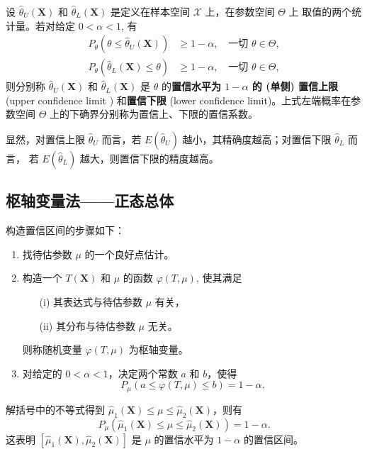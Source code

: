 \begin{definition}[单侧置信上限与置信下限]\label{def:one_sided_confidence_limit}
设 $\hat{\theta}_U(\mathbf{X})$ 和 $\hat{\theta}_L(\mathbf{X})$ 是定义在样本空间 $\mathcal{X}$ 上，在参数空间 $\Theta$ 上
取值的两个统计量。若对给定 $0 < \alpha < 1$, 有
\begin{align}
P_\theta(\theta \le \hat{\theta}_U(\mathbf{X})) &\ge 1-\alpha, \quad \text{一切 } \theta \in \Theta, \label{eq:upper_confidence_limit} \\
P_\theta(\hat{\theta}_L(\mathbf{X}) \le \theta) &\ge 1-\alpha, \quad \text{一切 } \theta \in \Theta, \label{eq:lower_confidence_limit}
\end{align}
则分别称 $\hat{\theta}_U(\mathbf{X})$ 和 $\hat{\theta}_L(\mathbf{X})$ 是 $\theta$ 的\textbf{置信水平为 $1-\alpha$ 的 (单侧) 置信上限} (upper
confidence limit ) 和\textbf{置信下限} (lower confidence limit)。上式左端概率在参数空间 $\Theta$
上的下确界分别称为置信上、下限的置信系数。

显然，对置信上限 $\hat{\theta}_U$ 而言，若 $E(\hat{\theta}_U)$ 越小，其精确度越高；对置信下限 $\hat{\theta}_L$ 而言，
若 $E(\hat{\theta}_L)$ 越大，则置信下限的精度越高。
\end{definition}

\subsection{枢轴变量法——正态总体}\label{subsec:枢轴变量法——正态总体}
\begin{proposition}[构造置信区间的一般步骤]\label{prop:构造置信区间的一般步骤}
构造置信区间的步骤如下：
\begin{enumerate}
    \item 找待估参数 $\mu$ 的一个良好点估计。
    \item 构造一个 $T(\mathbf{X})$ 和 $\mu$ 的函数 $\varphi(T, \mu)$, 使其满足
    \begin{enumerate}
        \item[(i)] 其表达式与待估参数 $\mu$ 有关，
        \item[(ii)] 其分布与待估参数 $\mu$ 无关。
    \end{enumerate}
    则称随机变量 $\varphi(T, \mu)$ 为枢轴变量。

    \item 对给定的 $0 < \alpha < 1$，决定两个常数 $a$ 和 $b$，使得
    \begin{equation}
    P_\mu(a \le \varphi(T, \mu) \le b) = 1-\alpha. \label{eq:pivotal_quantity_prob}
    \end{equation}
\end{enumerate}
解括号中的不等式得到 $\hat{\mu}_1(\mathbf{X}) \le \mu \le \hat{\mu}_2(\mathbf{X})$，则有
\begin{equation}
P_\mu(\hat{\mu}_1(\mathbf{X}) \le \mu \le \hat{\mu}_2(\mathbf{X})) = 1-\alpha. \label{eq:final_confidence_interval}
\end{equation}
这表明 $[\hat{\mu}_1(\mathbf{X}), \hat{\mu}_2(\mathbf{X})]$ 是 $\mu$ 的置信水平为 $1-\alpha$ 的置信区间。
\end{proposition}

